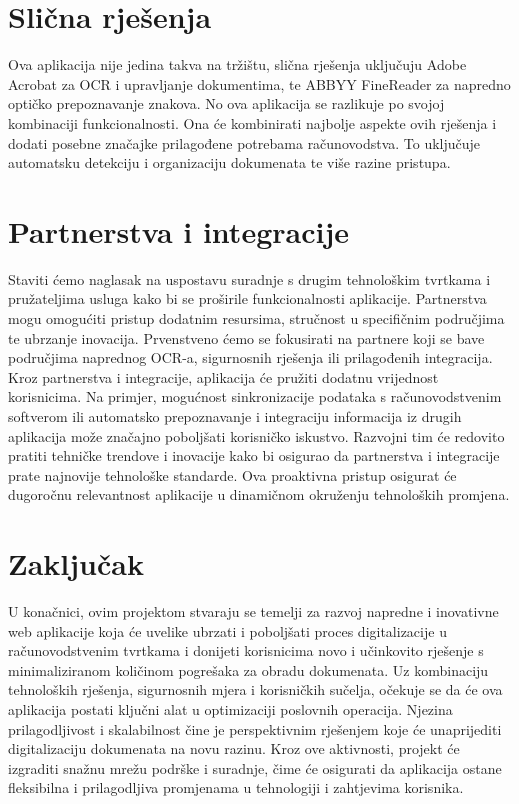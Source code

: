		\section{Slična rješenja}
		
		Ova aplikacija nije jedina takva na tržištu, slična rješenja uključuju Adobe Acrobat za OCR i upravljanje dokumentima, te ABBYY FineReader za napredno optičko prepoznavanje znakova. No ova aplikacija se razlikuje po svojoj kombinaciji funkcionalnosti. Ona će kombinirati najbolje aspekte ovih rješenja i dodati posebne značajke prilagođene potrebama računovodstva. To uključuje automatsku detekciju i organizaciju dokumenata te više razine pristupa.

		\section{Partnerstva i integracije}

		Staviti ćemo naglasak na uspostavu suradnje s drugim tehnološkim tvrtkama i pružateljima usluga kako bi se proširile funkcionalnosti aplikacije. Partnerstva mogu omogućiti pristup dodatnim resursima, stručnost u specifičnim područjima te ubrzanje inovacija.
		Prvenstveno ćemo se fokusirati na partnere koji se bave područjima naprednog OCR-a, sigurnosnih rješenja ili prilagođenih integracija. Kroz partnerstva i integracije, aplikacija će pružiti dodatnu vrijednost korisnicima. Na primjer, mogućnost sinkronizacije podataka s računovodstvenim softverom ili automatsko prepoznavanje i integraciju informacija iz drugih aplikacija može značajno poboljšati korisničko iskustvo.				 Razvojni tim će redovito pratiti tehničke trendove i inovacije kako bi osigurao da partnerstva i integracije prate najnovije tehnološke standarde. Ova proaktivna pristup osigurat će dugoročnu relevantnost aplikacije u dinamičnom okruženju tehnoloških promjena.
		
		\section{Zaključak}
		
		U konačnici, ovim projektom  stvaraju se temelji za razvoj napredne i inovativne web aplikacije koja će uvelike ubrzati i
		poboljšati proces digitalizacije u računovodstvenim tvrtkama i donijeti korisnicima novo i učinkovito rješenje s
		minimaliziranom količinom pogrešaka za obradu dokumenata. Uz kombinaciju tehnoloških rješenja, sigurnosnih mjera i korisničkih sučelja, očekuje se da će ova aplikacija postati ključni alat u optimizaciji poslovnih operacija. 
		Njezina prilagodljivost i skalabilnost čine je perspektivnim rješenjem koje će unaprijediti digitalizaciju dokumenata na novu razinu.
		Kroz ove aktivnosti, projekt će izgraditi snažnu mrežu podrške i suradnje, čime će osigurati da aplikacija ostane fleksibilna i prilagodljiva promjenama u tehnologiji i zahtjevima korisnika.
		\eject
			
	
